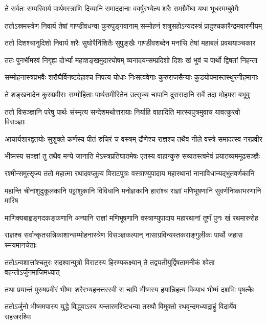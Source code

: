 \twolineshloka
{ते सर्वतः सम्परिवार्य पार्थमस्त्राणि दिव्यानि समाददानाः}
{ववर्षुरभ्येत्य शरैः समग्रैर्मेघा यथा भूधरमम्बुवेगैः}


\twolineshloka
{ततोऽस्रमस्त्रेण निवार्य तेषां गाण्डीवधन्वा कुरुपुङ्गवानाम्}
{सम्मोहनं शत्रुसहोऽन्यदस्त्रं प्रादुश्चकारैन्द्रमवारणीयम्}


\twolineshloka
{ततो दिशश्चानुदिशो निवार्य शरैः सुघोरैर्निशितैः सुपुङ्खैः}
{गाण्डीवशब्देन मनांसि तेषां महाबलं प्रवथयाञ्चकार}


\twolineshloka
{ततः पुनर्भीमरवं निगृह्य दोर्भ्यां महाशङ्खमुदारघोषम्}
{व्यनादयन्सम्प्रदिशो दिशः खं भुवं च पार्थो द्विषतां निहन्ता}


\twolineshloka
{सम्मोहनास्त्रप्रभवैः शरौघैर्विनष्टदेहाश्च निपत्य योधाः}
{निःसत्ववेगाः कुरुराजसैन्याः कुडयोपमास्तस्थुरनीहमानाः}


\twolineshloka
{ते शङ्खनादेन कुरुप्रवीराः सम्मोहिताः पार्थसमीरितेन}
{उत्सृज्य चापानि दुरासदानि सर्वे तदा मोहपरा बभूवुः}


\twolineshloka
{ततो विसञ्ज्ञानि परेषु पार्थः संस्मृत्य सन्देशमथोत्तरायाः}
{निर्याहि वाहादिति मात्स्यपुत्रमुवाच यावत्कुरवो विसञ्ज्ञाः}


\twolineshloka
{आचार्यशारद्वतयोः सुशुक्ले कर्णस्य पीतं रुचिरं च वस्त्रम्}
{द्रौणेश्च राज्ञश्च तथैव नीले वस्त्रे समादत्स्व नरप्रवीर}


\twolineshloka
{भीष्मस्य सञ्ज्ञां तु तथैव मन्ये जानाति मेऽस्त्रप्रतिघातमेषः}
{एतस्य वाहान्कुरु सव्यतस्त्वमेवं प्रयातव्यममूढसञ्ज्ञैः}


\twolineshloka
{रश्मीन्समुत्सृज्य ततो महात्मा रथादवप्लुत्य विराटपुत्रः}
{वस्त्राण्युपादाय महारथानां नानाविधान्यद्भुतवर्णकानि}


\twolineshloka
{महान्ति चीनांशुदुकूलकानि पट्टांशुकानि विविधानि मनोज्ञकानि}
{हारांश्च राज्ञां मणिभूषणानि सुवर्णनिष्काभरणानि मारिष}


\twolineshloka
{माणिक्यबाह्वङ्गदकङ्कणानि अन्यानि राज्ञां मणिभूषणानि}
{वस्त्राण्युपादाय महारथानां तूर्णं पुनः खं रथमारुरोह}


\twolineshloka
{राज्ञश्च सर्वान्कृतसन्निकाशान्सम्मोहनास्त्रेण विसञ्ज्ञकल्पान्}
{नासाग्रविन्यस्तकराङ्गुलीकः पार्थो जहास स्मयमानचेताः}


\twolineshloka
{ततोऽन्वशात्तांश्चतुरः सदश्वान्पुत्रो विराटस्य हिरण्यकक्ष्यान्}
{ते तद्व्यतीयुर्द्विषतामनीकं श्वेता वहन्तोऽर्जुनमाजिमध्यात्}


\twolineshloka
{तथा प्रयान्तं पुरुषप्रवीरं भीष्मः शरैरभ्यहनत्तरस्वी}
{स चापि भीष्मस्य हयान्निहत्य विव्याध भीष्मं दशभिः पृषत्कैः}


\twolineshloka
{ततोऽर्जुनो भीष्ममपास्य युद्धे विद्ध्वाऽस्य यन्तारमरिष्टधन्वा}
{तस्थौ विमुक्तो रथवृन्दमध्याद्राहुं विदार्येव सहस्ररश्मिः}


